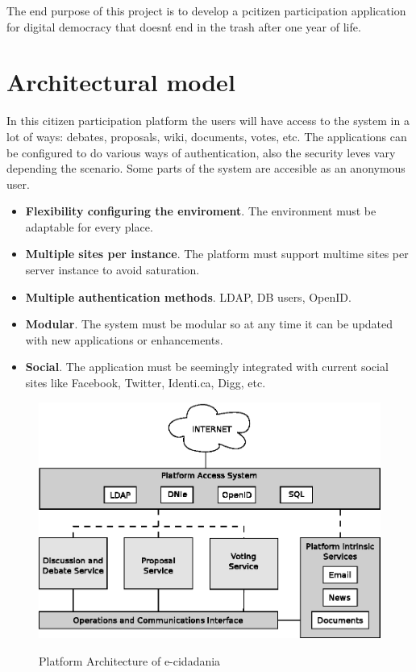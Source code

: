 \documentclass{article}
\begin{document}
The end purpose of this project is to develop a pcitizen participation application for digital democracy that doesn\'t end in the trash after one year of life.

\section{Architectural model}
In this citizen participation platform the users will have access to the system in a lot of ways: debates, proposals, wiki, documents, votes, etc. The applications can be configured to do various ways of authentication, also the security leves vary depending the scenario. Some parts of the system are accesible as an anonymous user.

\begin{itemize}
\item {\bf Flexibility configuring the enviroment}. The environment must be adaptable for every place.
\item {\bf Multiple sites per instance}. The platform must support multime sites per server instance to avoid saturation.
\item {\bf Multiple authentication methods}. LDAP, DB users, OpenID.
\item {\bf Modular}. The system must be modular so at any time it can be updated with new applications or enhancements.
\item {\bf Social}. The application must be seemingly integrated with current social sites like Facebook, Twitter, Identi.ca, Digg, etc.
\end{itemize}

\newpage

\begin{figure}
	\centering
		\includegraphics[scale=1]{../images/architecture.eps}\\
	\caption{Platform Architecture of e-cidadania}

\end{figure}
\end{document}
